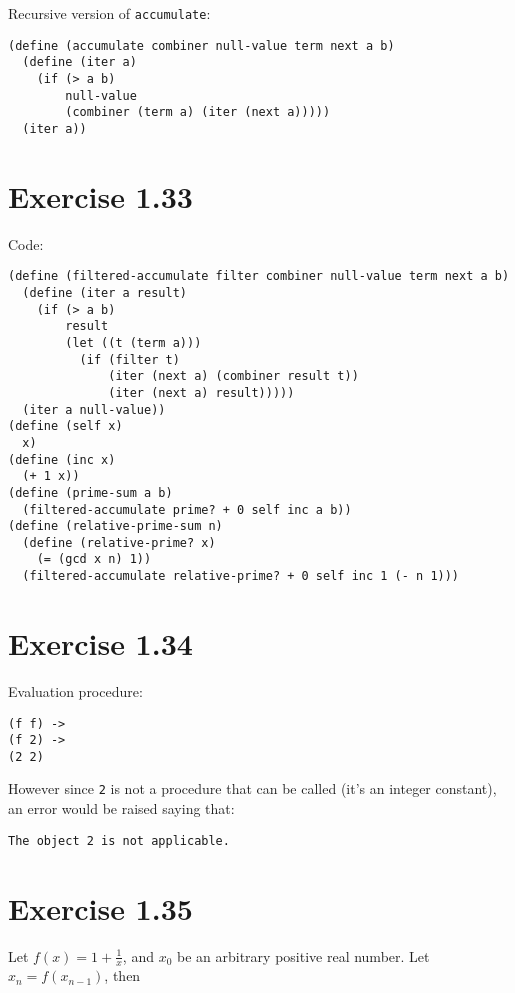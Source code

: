 \documentclass[../main.tex]{subfiles}
\begin{document}
Recursive version of \lstinline{accumulate}:

\begin{lstlisting}
(define (accumulate combiner null-value term next a b)
  (define (iter a)
    (if (> a b)
        null-value
        (combiner (term a) (iter (next a)))))
  (iter a))
\end{lstlisting}

\section{Exercise 1.33}

Code:

\begin{lstlisting}
(define (filtered-accumulate filter combiner null-value term next a b)
  (define (iter a result)
    (if (> a b)
        result
        (let ((t (term a)))
          (if (filter t)
              (iter (next a) (combiner result t))
              (iter (next a) result)))))
  (iter a null-value))
(define (self x)
  x)
(define (inc x)
  (+ 1 x))
(define (prime-sum a b)
  (filtered-accumulate prime? + 0 self inc a b))
(define (relative-prime-sum n)
  (define (relative-prime? x)
    (= (gcd x n) 1))
  (filtered-accumulate relative-prime? + 0 self inc 1 (- n 1)))
\end{lstlisting}

\section{Exercise 1.34}

Evaluation procedure:

\begin{lstlisting}
(f f) ->
(f 2) ->
(2 2)
\end{lstlisting}

However since \lstinline{2} is not a
 procedure that can be called (it's an
 integer constant), an error would be
 raised saying that:

\begin{lstlisting}
The object 2 is not applicable.
\end{lstlisting}

\section{Exercise 1.35}

Let $f(x)=1+\frac{1}{x}$, and $x_0$ be an arbitrary
 positive real number. Let $x_n=f(x_{n-1})$, then
\end{document}
